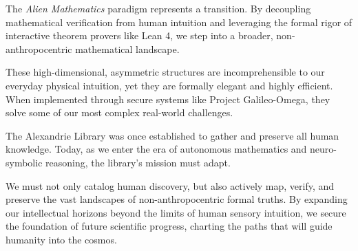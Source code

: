 \documentclass[11pt,a4paper]{book}
\newcommand{\todo}[1]{\textbf{TODO: #1}}
\begin{document}
The \textit{Alien Mathematics} paradigm represents a transition. By decoupling mathematical verification from human intuition and leveraging the formal rigor of interactive theorem provers like Lean 4, we step into a broader, non-anthropocentric mathematical landscape. 

These high-dimensional, asymmetric structures are incomprehensible to our everyday physical intuition, yet they are formally elegant and highly efficient. When implemented through secure systems like Project Galileo-Omega, they solve some of our most complex real-world challenges.

The Alexandrie Library was once established to gather and preserve all human knowledge. Today, as we enter the era of autonomous mathematics and neuro-symbolic reasoning, the library's mission must adapt. 

We must not only catalog human discovery, but also actively map, verify, and preserve the vast landscapes of non-anthropocentric formal truths. By expanding our intellectual horizons beyond the limits of human sensory intuition, we secure the foundation of future scientific progress, charting the paths that will guide humanity into the cosmos.


\end{document}
